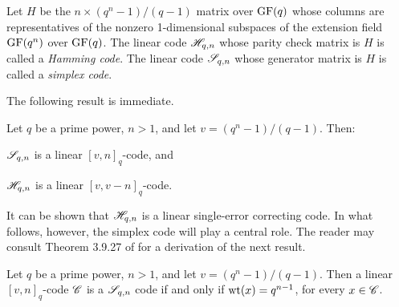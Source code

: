 \documentclass[../../../main]{subfiles}
\begin{document}
\begin{defin}\label{hamming-code}\label{hamming-simplex-def}
  Let $H$ be the $n \times (q^n-1)/(q-1)$ matrix over $\text{GF}(q)$ whose columns are representatives of the nonzero 1-dimensional subspaces of the extension field $\text{GF}(q^n)$ over $\text{GF}(q)$. The linear code $\mathscr{H}_{q,n}$ whose parity check matrix is $H$ is called a {\it Hamming code}. The linear code $\mathscr{S}_{q,n}$ whose generator matrix is $H$ is called a {\it simplex code}.
\end{defin}

The following result is immediate.

\begin{prop}
  Let $q$ be a prime power, $n > 1$, and let $v=(q^n-1)/(q-1)$. Then:
  \begin{defenum}
  \item $\mathscr{S}_{q,n}$ is a linear $[v,n]_q$-code, and
  \item $\mathscr{H}_{q,n}$ is a linear $[v,v-n]_q$-code.
  \end{defenum}
\end{prop}

It can be shown that $\mathscr{H}_{q,n}$ is a linear
single-error correcting code. In what follows, however, the simplex code will
play a central role. The reader may consult Theorem 3.9.27 of
\cite{combinatorics-of-symmetric-designs} for a derivation of the next result.

\begin{thm}\label{simplex-properties}
  Let $q$ be a prime power, $n>1$, and let $v=(q^n-1)/(q-1)$. Then a linear $[v,n]_q$-code $\mathscr{C}$ is a $\mathscr{S}_{q,n}$ code if and only if $\text{wt}(x)=q^{n-1}$, for every $x \in \mathscr{C}$.
\end{thm}

\biblio
\end{document}
